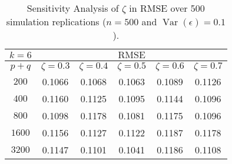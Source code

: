 \begin{table}[H]
\centering
\small 
\begin{tabular}{|c|ccccc|}
\hline
$k=6$  & \multicolumn{5}{c|}{$\text{RMSE}$}                                                                                                                 \\ \hline
$p+q$  & \multicolumn{1}{c|}{$\zeta = 0.3$} & \multicolumn{1}{c|}{$\zeta = 0.4$} & \multicolumn{1}{c|}{$\zeta = 0.5$} & \multicolumn{1}{c|}{$\zeta = 0.6$} & $\zeta = 0.7$ \\ \hline
$200$  & \multicolumn{1}{c|}{0.1066}              & \multicolumn{1}{c|}{0.1068}              & \multicolumn{1}{c|}{0.1063}              & \multicolumn{1}{c|}{0.1089}              &               0.1126\\
$400$  & \multicolumn{1}{c|}{0.1160}              & \multicolumn{1}{c|}{0.1125}              & \multicolumn{1}{c|}{0.1095}              & \multicolumn{1}{c|}{0.1144}              &               0.1096\\
$800$  & \multicolumn{1}{c|}{0.1098}              & \multicolumn{1}{c|}{0.1178}              & \multicolumn{1}{c|}{0.1081}              & \multicolumn{1}{c|}{0.1175}              &               0.1096\\
$1600$ & \multicolumn{1}{c|}{0.1156}              & \multicolumn{1}{c|}{0.1127}              & \multicolumn{1}{c|}{0.1122}              & \multicolumn{1}{c|}{0.1187}              &               0.1178\\
$3200$ & \multicolumn{1}{c|}{0.1147}              & \multicolumn{1}{c|}{0.1101}              & \multicolumn{1}{c|}{0.1041}              & \multicolumn{1}{c|}{0.1186}              &               0.1108\\ \hline
\end{tabular}
\caption{Sensitivity Analysis of $\zeta$ in RMSE over 500 simulation replications ($n = 500$ and $\operatorname{Var}(\epsilon) = 0.1$).}
\label{tab:sen1}
\end{table}
